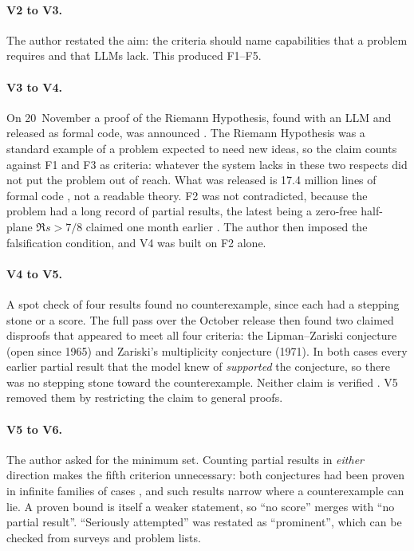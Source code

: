 \documentclass[11pt,a4paper]{article}
\theoremstyle{prob}
\begin{document}
\paragraph{V2 to V3.} The author restated the aim: the criteria should name capabilities that a problem requires and that LLMs lack. This produced F1--F5.

\paragraph{V3 to V4.} On 20~November a proof of the Riemann Hypothesis, found with an LLM and released as formal code, was announced \cite{rhscience}. The Riemann Hypothesis was a standard example of a problem expected to need new ideas, so the claim counts against F1 and F3 as criteria: whatever the system lacks in these two respects did not put the problem out of reach. What was released is 17.4 million lines of formal code \cite{rhdev}, not a readable theory. F2 was not contradicted, because the problem had a long record of partial results, the latest being a zero-free half-plane $\Re s>7/8$ claimed one month earlier \cite{openairepo}. The author then imposed the falsification condition, and V4 was built on F2 alone.

\paragraph{V4 to V5.} A spot check of four results found no counterexample, since each had a stepping stone or a score. The full pass over the October release then found two claimed disproofs that appeared to meet all four criteria: the Lipman--Zariski conjecture (open since 1965) and Zariski's multiplicity conjecture (1971). In both cases every earlier partial result that the model knew of \emph{supported} the conjecture, so there was no stepping stone toward the counterexample. Neither claim is verified \cite{nakai,sampaio}. V5 removed them by restricting the claim to general proofs.

\paragraph{V5 to V6.} The author asked for the minimum set. Counting partial results in \emph{either} direction makes the fifth criterion unnecessary: both conjectures had been proven in infinite families of cases \cite{graf,hochster,greuel}, and such results narrow where a counterexample can lie. A proven bound is itself a weaker statement, so ``no score'' merges with ``no partial result''. ``Seriously attempted'' was restated as ``prominent'', which can be checked from surveys and problem lists.
\end{document}
